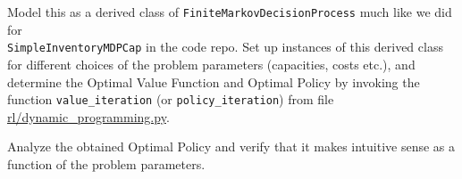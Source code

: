 \documentclass[12pt]{exam}
\begin{document}
\begin{questions}
Model this as a derived class of \lstinline{FiniteMarkovDecisionProcess} much like we did for \\ \lstinline{SimpleInventoryMDPCap} in the code repo. Set up instances of this derived class for different choices of the problem parameters (capacities, costs etc.), and determine the Optimal Value Function and Optimal Policy by invoking the function \lstinline{value_iteration} (or \lstinline{policy_iteration}) from file \href{https://github.com/TikhonJelvis/RL-book/blob/master/rl/dynamic_programming.py}{rl\//dynamic\_programming.py}.

Analyze the obtained Optimal Policy and verify that it makes intuitive sense as a function of the problem parameters.

\end{questions}
\end{document}
